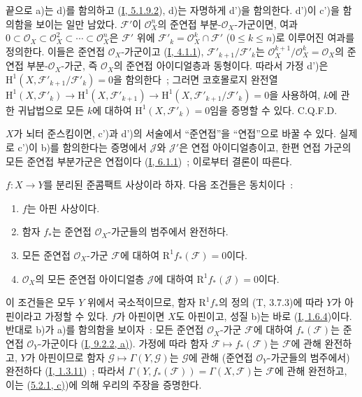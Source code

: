 끝으로 a)는 d)를 함의하고 (\hyperref[I.5.1.9.2-ko]{I, 5.1.9.2}),
d)는 자명하게 d')을 함의한다. d')이 c')을 함의함을 보이는 일만
남았다. $\mathcal{F}'$이 $\mathcal{O}_X^n$의 준연접
부분-$\mathcal{O}_X$-가군이면, 여과
$0\subset\mathcal{O}_X\subset\mathcal{O}_X^2\subset\cdots\subset
\mathcal{O}_X^n$은 $\mathcal{F}'$ 위에
$\mathcal{F}'_k=\mathcal{O}_X^k\cap\mathcal{F}'$ ($0\leq k\leq n$)로
이루어진 여과를 정의한다. 이들은 준연접 $\mathcal{O}_X$-가군이고
(\hyperref[I.4.1.1-ko]{I, 4.1.1}),
$\mathcal{F}'_{k+1}/\mathcal{F}'_k$는
$\mathcal{O}_X^{k+1}/\mathcal{O}_X^k=\mathcal{O}_X$의 준연접
부분-$\mathcal{O}_X$-가군, 즉 $\mathcal{O}_X$의 준연접 아이디얼층과
동형이다. 따라서 가정 d')은
$\mathrm{H}^1(X,\mathcal{F}'_{k+1}/\mathcal{F}'_k)=0$을 함의한다~;
그러면 코호몰로지 완전열
$\mathrm{H}^1(X,\mathcal{F}'_k)\to\mathrm{H}^1(X,\mathcal{F}'_{k+1})
\to\mathrm{H}^1(X,\mathcal{F}'_{k+1}/\mathcal{F}'_k)=0$을 사용하여,
$k$에 관한 귀납법으로 모든 $k$에 대하여
$\mathrm{H}^1(X,\mathcal{F}'_k)=0$임을 증명할 수 있다. C.Q.F.D.

\begin{remark}[5.2.1.1]
\label{II.5.2.1.1-ko}
$X$가 뇌터 준스킴이면, c')과 d')의 서술에서 ``준연접''을 ``연접''으로
바꿀 수 있다. 실제로 c')이 b)를 함의한다는 증명에서
$\mathcal{J}$와 $\mathcal{J}'$은 연접 아이디얼층이고, 한편 연접 가군의
모든 준연접 부분가군은 연접이다
(\hyperref[I.6.1.1-ko]{I, 6.1.1})~; 이로부터 결론이 따른다.
\end{remark}

\begin{corollary}[5.2.2]
\label{II.5.2.2-ko}
$f:X\to Y$를 분리된 준콤팩트 사상이라 하자. 다음 조건들은
동치이다~:
\begin{enumerate}
  \item[\rm{a)}] $f$는 아핀 사상이다.
  \item[\rm{b)}] 함자 $f_*$는 준연접
  $\mathcal{O}_X$-가군들의 범주에서 완전하다.
  \item[\rm{c)}] 모든 준연접 $\mathcal{O}_X$-가군
  $\mathcal{F}$에 대하여 $\mathrm{R}^1f_*(\mathcal{F})=0$이다.
  \item[\rm{c')}] $\mathcal{O}_X$의 모든 준연접 아이디얼층
  $\mathcal{J}$에 대하여 $\mathrm{R}^1f_*(\mathcal{J})=0$이다.
\end{enumerate}
\end{corollary}

이 조건들은 모두 $Y$ 위에서 국소적이므로, 함자
$\mathrm{R}^1f_*$의 정의 (T, 3.7.3)에 따라 $Y$가 아핀이라고
가정할 수 있다. $f$가 아핀이면 $X$도 아핀이고, 성질 b)는 바로
(\hyperref[I.1.6.4-ko]{I, 1.6.4})이다. 반대로 b)가 a)를 함의함을
보이자~: 모든 준연접 $\mathcal{O}_X$-가군 $\mathcal{F}$에 대하여
$f_*(\mathcal{F})$는 준연접 $\mathcal{O}_Y$-가군이다
(\hyperref[I.9.2.2-ko]{I, 9.2.2, a)}). 가정에 따라 함자
$\mathcal{F}\mapsto f_*(\mathcal{F})$는 $\mathcal{F}$에 관해 완전하고,
$Y$가 아핀이므로 함자 $\mathcal{G}\mapsto\Gamma(Y,\mathcal{G})$는
$\mathcal{G}$에 관해 (준연접 $\mathcal{O}_Y$-가군들의 범주에서)
완전하다 (\hyperref[I.1.3.11-ko]{I, 1.3.11})~; 따라서
$\Gamma(Y,f_*(\mathcal{F}))=\Gamma(X,\mathcal{F})$는
$\mathcal{F}$에 관해 완전하고, 이는
(\hyperref[II.5.2.1-ko]{5.2.1, c)})에 의해 우리의 주장을 증명한다.

